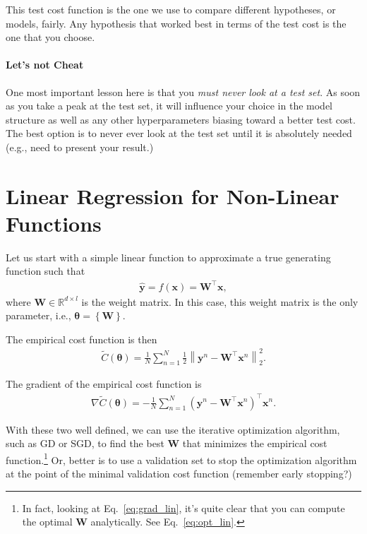 \documentclass{report}
\newcommand{\vect}[1]{\mathbf{#1}}
\newcommand{\vects}[1]{\boldsymbol{#1}}
\newcommand{\matr}[1]{\mathbf{#1}}
\newcommand{\vx}[0]{\vect{x}}
\newcommand{\vy}[0]{\vect{y}}
\newcommand{\mW}[0]{\matr{W}}
\newcommand{\TT}[0]{\vects{\theta}}
\newcommand{\RR}[0]{\mathbb{R}}
\begin{document}
This test cost function is the one we use to compare different hypotheses, or
models, fairly. Any hypothesis that worked best in terms of the test cost is the
one that you choose.

\paragraph{Let's not Cheat}
One most important lesson here is that you {\em must never look at a test set}.
As soon as you take a peak at the test set, it will influence your choice in the
model structure as well as any other hyperparameters biasing toward a better
test cost. The best option is to never ever look at the test set until it is
absolutely needed (e.g., need to present your result.)

\section{Linear Regression for Non-Linear Functions}

Let us start with a simple linear function to approximate a true generating
function such that
\begin{align*}
    \hat{\vy} = f(\vx) = \mW^\top \vx, 
\end{align*}
where $\mW \in \RR^{d \times l}$ is the weight matrix. In this case, this weight
matrix is the only parameter, i.e., $\TT=\left\{ \mW \right\}$.

The empirical cost function is then
\begin{align*}
    \tilde{C}(\TT) = \frac{1}{N} \sum_{n=1}^N \frac{1}{2} \left\| \vy^n - \mW^\top \vx^n
    \right\|^2_2.
\end{align*}

The gradient of the empirical cost function is
\begin{align}
    \label{eq:grad_lin}
    \nabla \tilde{C}(\TT) = -\frac{1}{N} \sum_{n=1}^N 
    \left( \vy^n - \mW^\top \vx^n\right)^\top \vx^n.
\end{align}

With these two well defined, we can use the iterative optimization algorithm,
such as GD or SGD, to find the best $\mW$ that minimizes the empirical cost
function.\footnote{
    In fact, looking at Eq.~\eqref{eq:grad_lin}, it's quite clear that you can
    compute the optimal $\mW$ analytically. See Eq.~\eqref{eq:opt_lin}.
}
Or, better is to use a validation set to stop the optimization
algorithm at the point of the minimal validation cost function (remember early
stopping?)
\end{document}
